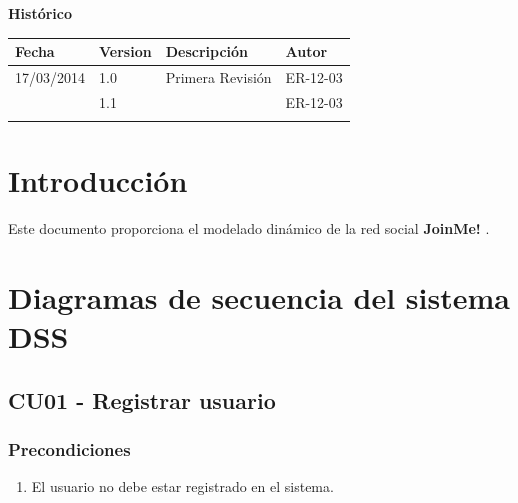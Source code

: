 \documentclass[12pt, a4paper, titlepage]{article}
\begin{document}
\begin{titlepage}
\vspace{2cm}

\begin{center}
	\large{\textbf{Histórico}}
	
    \begin{tabular}{ | p{4cm} | p{2cm} | p{6cm} | p{3cm} |}
    \hline
    \textbf{Fecha} & \textbf{Version} & \textbf{Descripción} & \textbf{Autor} \\ \hline
      17/03/2014 & 1.0 & Primera Revisión & ER-12-03\\ \hline
      & 1.1 &  & ER-12-03\\ \hline
     &  & &\\ \hline
    \end{tabular}
\end{center}

\end{titlepage}
\clearpage


\tableofcontents
\clearpage


\section{Introducción}

Este documento proporciona el modelado dinámico de la red social \textbf{JoinMe!} .


\section{Diagramas de secuencia del sistema DSS }

\subsection{CU01 - Registrar usuario}

\subsubsection{Precondiciones}
\begin{enumerate}
	\item El usuario no debe estar registrado en el sistema.
\end{enumerate}
\end{document}
